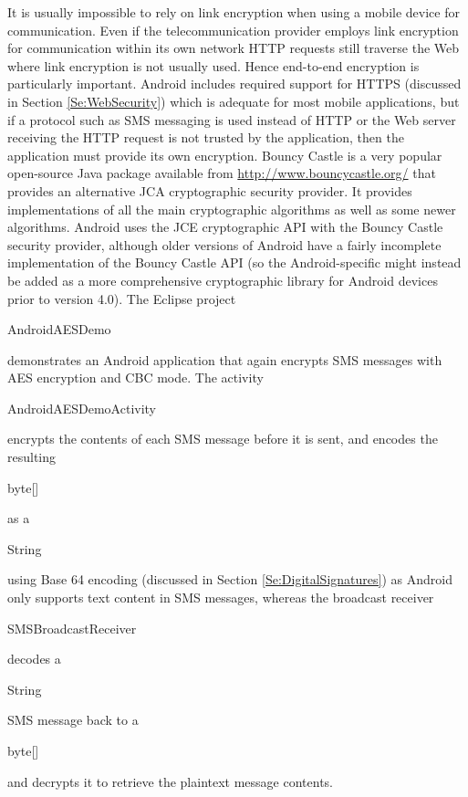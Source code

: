 It is usually impossible to rely on link encryption when using a mobile device
for communication. Even if the telecommunication provider employs link encryption
for communication within its own network HTTP requests still traverse the Web
where link encryption is not usually used. Hence end-to-end encryption is
particularly important. Android includes required support for HTTPS
(discussed in Section \ref{Se:WebSecurity}) which is adequate for most
mobile applications, but if a protocol such as SMS messaging is used instead of
HTTP or the Web server receiving the HTTP request is not trusted by the application,
then the application must provide its own encryption. Bouncy Castle is a very popular
open-source Java package available from \url{http://www.bouncycastle.org/}
that provides an alternative JCA cryptographic security provider.
It provides implementations of all the main cryptographic algorithms
as well as some newer algorithms. Android uses the JCE cryptographic API with the Bouncy Castle security provider,
although older versions of Android have a fairly incomplete implementation of the
Bouncy Castle API
(so the Android-specific  might instead be
added as a more comprehensive cryptographic library for Android devices prior to version 4.0).
The Eclipse project \begin{code}AndroidAESDemo\end{code} demonstrates an Android
application that again encrypts SMS messages with AES encryption and CBC mode.
The activity \begin{code}AndroidAESDemo\-Activity\end{code} encrypts the contents of
each SMS message before it is sent, and encodes the resulting \begin{code}byte[]\end{code}
as a \begin{code}String\end{code} using Base 64 encoding
(discussed in Section \ref{Se:DigitalSignatures}) as Android only supports text content
in SMS messages,
whereas the broadcast receiver \begin{code}SMSBroadcastReceiver\end{code}
decodes a \begin{code}String\end{code} SMS message back to a \begin{code}byte[]\end{code}
and decrypts it to retrieve the plaintext message contents.


